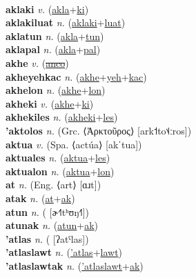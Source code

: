  \label{aklasapuluat} \\
\textbf{aklaki} \textit{v.} (\hyperref[akla]{akla}+\hyperref[ki]{ki})
 \label{aklaki} \\
\textbf{aklakiluat} \textit{n.} (\hyperref[aklaki]{aklaki}+\hyperref[luat]{luat})
 \label{aklakiluat} \\
\textbf{aklatun} \textit{n.} (\hyperref[akla]{akla}+\hyperref[tun]{tun})
 \label{aklatun} \\
\textbf{aklapal} \textit{n.} (\hyperref[akla]{akla}+\hyperref[pal]{pal})
 \label{aklapal} \\
\textbf{akhe} \textit{v.} (\hyperref[anco]{\sout{anco}})
 \label{akhe} \\
\textbf{akheyehkac} \textit{n.} (\hyperref[akhe]{akhe}+\hyperref[yeh]{yeh}+\hyperref[kac]{kac})
 \label{akheyehkac} \\
\textbf{akhelon} \textit{n.} (\hyperref[akhe]{akhe}+\hyperref[lon]{lon})
 \label{akhelon} \\
\textbf{akheki} \textit{v.} (\hyperref[akhe]{akhe}+\hyperref[ki]{ki})
 \label{akheki} \\
\textbf{akhekiles} \textit{n.} (\hyperref[akheki]{akheki}+\hyperref[les]{les})
 \label{akhekiles} \\
\textbf{'aktolos} \textit{n.} (Grc. ⟨Ἀρκτοῦρος⟩ [ark˦to˦˨ːros])
 \label{'aktolos} \\
\textbf{aktua} \textit{v.} (Spa. ⟨actúa⟩ [akˈtua])
 \label{aktua} \\
\textbf{aktuales} \textit{n.} (\hyperref[aktua]{aktua}+\hyperref[les]{les})
 \label{aktuales} \\
\textbf{aktualon} \textit{n.} (\hyperref[aktua]{aktua}+\hyperref[lon]{lon})
 \label{aktualon} \\
\textbf{at} \textit{n.} (Eng. ⟨art⟩ [ɑɹt])
 \label{at} \\
\textbf{atak} \textit{n.} (\hyperref[at]{at}+\hyperref[ak]{ak})
 \label{atak} \\
\textbf{atun} \textit{n.} ( [ɚ˧˥tʰʊŋ˧˥])
 \label{atun} \\
\textbf{atunak} \textit{n.} (\hyperref[atun]{atun}+\hyperref[ak]{ak})
 \label{atunak} \\
\textbf{'atlas} \textit{n.} ( [ʔatˤlas])
 \label{'atlas} \\
\textbf{'atlaslawt} \textit{n.} (\hyperref['atlas]{'atlas}+\hyperref[lawt]{lawt})
 \label{'atlaslawt} \\
\textbf{'atlaslawtak} \textit{n.} (\hyperref['atlaslawt]{'atlaslawt}+\hyperref[ak]{ak})
